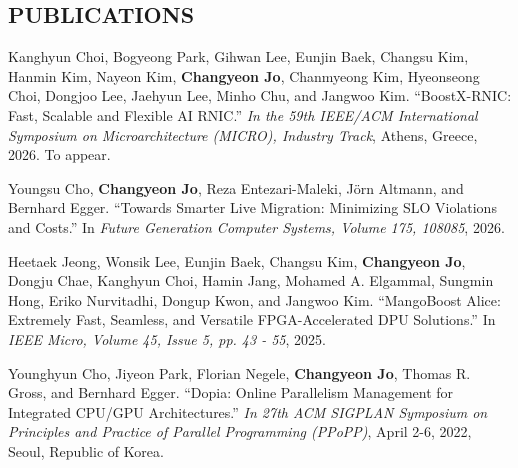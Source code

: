 \documentclass[margin]{res}
\begin{document}
\begin{resume}


\section{PUBLICATIONS}
Kanghyun Choi, Bogyeong Park, Gihwan Lee, Eunjin Baek, Changsu Kim, Hanmin Kim, Nayeon Kim, \textbf{Changyeon Jo}, Chanmyeong Kim, Hyeonseong Choi, Dongjoo Lee, Jaehyun Lee, Minho Chu, and Jangwoo Kim. ``BoostX-RNIC: Fast, Scalable and Flexible AI RNIC.'' \textit{In the 59th IEEE/ACM International Symposium on Microarchitecture (MICRO), Industry Track}, Athens, Greece, 2026. To appear.

\vspace{-0.5em}
Youngsu Cho, \textbf{Changyeon Jo}, Reza Entezari-Maleki, J{\"o}rn Altmann, and Bernhard Egger. ``Towards Smarter Live Migration: Minimizing SLO Violations and Costs.'' In \textit{Future Generation Computer Systems, Volume 175, 108085}, 2026.

\vspace{-0.5em}
Heetaek Jeong, Wonsik Lee, Eunjin Baek, Changsu Kim, \textbf{Changyeon Jo}, Dongju Chae, Kanghyun Choi, Hamin Jang, Mohamed A. Elgammal, Sungmin Hong, Eriko Nurvitadhi, Dongup Kwon, and Jangwoo Kim. ``MangoBoost Alice: Extremely Fast, Seamless, and Versatile FPGA-Accelerated DPU Solutions.'' In \textit{IEEE Micro, Volume 45, Issue 5, pp. 43 - 55}, 2025.

\vspace{-0.5em}
Younghyun Cho, Jiyeon Park, Florian Negele, \textbf{Changyeon Jo}, Thomas R. Gross, and Bernhard Egger. ``Dopia: Online Parallelism Management for Integrated CPU/GPU Architectures.'' \textit{In 27th ACM SIGPLAN Symposium on Principles and Practice of Parallel Programming (PPoPP)}, April 2-6, 2022, Seoul, Republic of Korea.


\end{resume}
\end{document}

